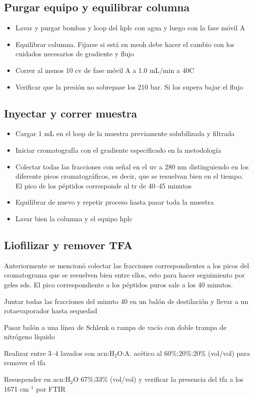 \begin{appendix}
\subsection{Purgar equipo y equilibrar columna}
     \begin{itemize}
        \item{Lavar y purgar bombas y loop del \ac{hplc} con agua y luego con la fase móvil A}
        \item{Equilibrar columna. Fijarse si está en \ac{meoh} debe hacer el cambio con los cuidados necesarios de gradiente y flujo}
        \item{Correr al menos 10 \ac{cv} de fase móvil A a 1.0 mL/min a 40\textdegree C}
        \item{Verificar que la presión no sobrepase los 210 bar. Si los supera bajar el flujo}
    \end{itemize}

\subsection{Inyectar y correr muestra}
     \begin{itemize}
        \item{Cargar 1 mL en el loop de la muestra previamente solubilizada y filtrada}
        \item{Iniciar cromatografía con el gradiente especificado en la metodología}
        \item{Colectar todas las fracciones con señal en el \ac{uv} a 280 nm distinguiendo en los diferente picos cromatográficos, es decir, que se resuelvan bien en el tiempo. El pico de los péptidos corresponde al \ac{tr} de 40--45 minutos}
        \item{Equilibrar de nuevo y repetir proceso hasta pasar toda la muestra}
        \item{Lavar bien la columna y el equipo \ac{hplc}}
    \end{itemize}

\subsection{Liofilizar y remover TFA}
    Anteriormente se mencionó colectar las fracciones correspondientes a los picos del cromatograma que se resuelven bien entre ellos, esto para hacer seguimiento por geles \ac{sds}. El pico correspondiente a los péptidos puros sale a los 40 minutos.
     \begin{itemize}
        \item{Juntar todas las fracciones del minuto 40 en un balón de destilación y llevar a un rotaevaporador hasta sequedad}
        \item{Pasar balón a una línea de Schlenk o rampa de vacío con doble trampa de nitrógeno líquido
        \item{Realizar entre 3--4 lavados con \ac{acn}:H$_{2}$O:A. acético} al 60\%:20\%:20\% (vol/vol) para remover el \ac{tfa}}
        \item{Resuspender en \ac{acn}:H$_{2}$O 67\%:33\% (vol/vol) y verificar la presencia del \ac{tfa} a los 1671 cm$^{\text{--1}}$ por FTIR}
    \end{itemize}

\end{appendix}